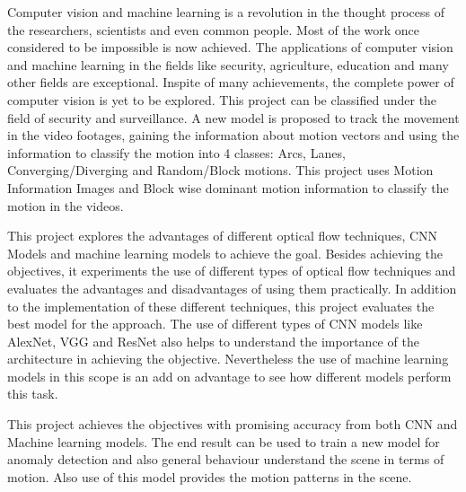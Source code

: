 
Computer vision and machine learning is a revolution in the thought process of the researchers, scientists and even common people. Most of the work once considered to be impossible is now achieved. The applications of computer vision and machine learning in the fields like security, agriculture, education and many other fields are exceptional. Inspite of many achievements, the complete power of computer vision is yet to be explored. This project can be classified under the field of security and surveillance.  A new model is proposed to track the movement in the video footages, gaining the information about motion vectors and using the information to classify the motion into 4 classes: Arcs, Lanes, Converging/Diverging and Random/Block motions. This project uses Motion Information Images and Block wise dominant motion information to classify the motion in the videos.

This project explores the advantages of different optical flow techniques, CNN Models and machine learning models to achieve the goal. Besides achieving the objectives, it experiments the use of different types of optical flow techniques and evaluates the advantages and disadvantages of using them practically. In addition to the implementation of these different techniques, this project evaluates the best model for the approach. The use of different types of CNN models like AlexNet, VGG and ResNet also helps to understand the importance of the architecture in achieving the objective. Nevertheless the use of machine learning models in this scope is an add on advantage to see how different models perform this task.

This project achieves the objectives with promising accuracy from both CNN and Machine learning models. The end result can be used to train a new model for anomaly detection and also general behaviour understand the scene in terms of motion. Also use of this model provides the motion patterns in the scene.